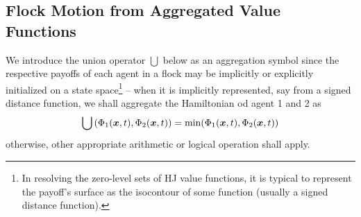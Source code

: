 \subsection{Flock Motion from Aggregated Value Functions}
We introduce the union operator \ie $\bigcup$ below as an aggregation symbol since the respective payoffs of each agent in a flock may be implicitly or explicitly initialized  on a state space\footnote{In resolving the zero-level sets of HJ value functions, it is typical to represent the payoff's surface as the isocontour of some function (usually a signed distance function).} -- when it is implicitly represented, say from a signed distance function, we shall aggregate the  Hamiltonian od agent 1 and 2 as
%
\begin{align}
	\bigcup\left(\Phi_1(\bm{x}, t), \Phi_2(\bm{x}, t)\right) = 	\min(\Phi_1(\bm{x}, t), \Phi_2(\bm{x}, t))
	\label{eq:sdf_union}
\end{align}
%
otherwise, other appropriate arithmetic or logical operation shall apply.

